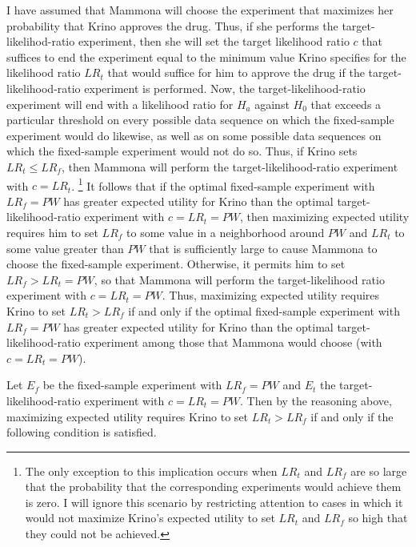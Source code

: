 \documentclass{article}
\theoremstyle{definition}
\begin{document}
I have assumed that Mammona will choose the experiment that maximizes her probability that Krino approves the drug.
Thus, if she performs the target-likelihod-ratio experiment, then she will set the target likelihood ratio $c$ that suffices to end the experiment equal to the minimum value Krino specifies for the likelihood ratio $LR_t$ that would suffice for him to approve the drug if the target-likelihood-ratio experiment is performed.
Now, the target-likelihood-ratio experiment will end with a likelihood ratio for $H_a$ against $H_0$ that exceeds a particular threshold on every possible data sequence on which the fixed-sample experiment would do likewise, as well as on some possible data sequences on which the fixed-sample experiment would not do so.
Thus, if Krino sets $LR_t\leq LR_f$, then Mammona will perform the target-likelihood-ratio experiment with $c=LR_t$.%
\footnote{%
The only exception to this implication occurs when $LR_t$ and $LR_f$ are so large that the probability that the corresponding experiments would achieve them is zero.
I will ignore this scenario by restricting attention to cases in which it would not maximize Krino's expected utility to set $LR_t$ and $LR_f$ so high that they could not be achieved.
}
It follows that if the optimal fixed-sample experiment with $LR_f=PW$ has greater expected utility for Krino than the optimal target-likelihood-ratio experiment with $c=LR_t=PW$, then maximizing expected utility requires him to set $LR_f$ to some value in a neighborhood around $PW$ and $LR_t$ to some value greater than $PW$ that is sufficiently large to cause Mammona to choose the fixed-sample experiment.
Otherwise, it permits him to set $LR_f>LR_t=P W$, so that Mammona will perform the target-likelihood ratio experiment with $c=LR_t=P W$.
Thus, maximizing expected utility requires Krino to set $LR_t>LR_f$ if and only if the optimal fixed-sample experiment with $LR_f=PW$ has greater expected utility for Krino than the optimal target-likelihood-ratio experiment among those that Mammona would choose (with $c=LR_t=PW$).

Let $E_f$ be the fixed-sample experiment with $LR_f=P W$ and $E_t$ the target-likelihood-ratio experiment with $c=LR_t=P W$.
Then by the reasoning above, maximizing expected utility requires Krino to set $LR_t>LR_f$ if and only if the following condition is satisfied.
\end{document}

